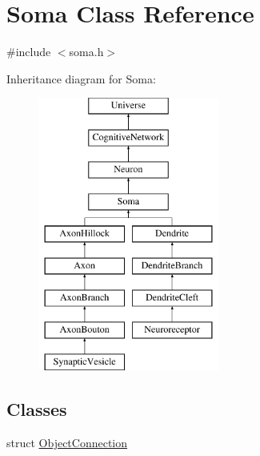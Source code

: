 \hypertarget{classSoma}{}\section{Soma Class Reference}
\label{classSoma}


{\ttfamily \#include $<$soma.\+h$>$}

Inheritance diagram for Soma\+:\begin{figure}[H]
\begin{center}
\leavevmode
\includegraphics[height=9.000000cm]{classSoma}
\end{center}
\end{figure}
\subsection*{Classes}
\begin{DoxyCompactItemize}
\item 
struct \mbox{\hyperlink{structSoma_1_1ObjectConnection}{Object\+Connection}}
\end{DoxyCompactItemize}
